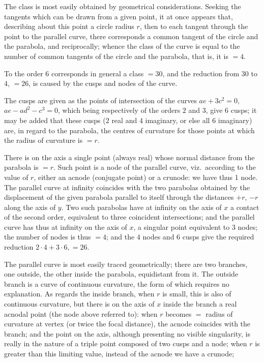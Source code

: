 \documentclass[11pt,a4paper]{article}
\theoremstyle{plain}
\theoremstyle{definition}
\begin{document}
The class is most easily obtained by geometrical considerations. Seeking the
tangents which can be drawn from a given point, it at once appears that, describing
about this point a circle radius $r$, then to each tangent through the point to the
parallel curve, there corresponds a common tangent of the circle and the parabola, and
reciprocally; whence the class of the curve is equal to the number of common tangents
of the circle and the parabola, that is, it is $= 4$.

To the order 6 corresponds in general a class $= 30$, and the reduction from
$30$ to $4$, $= 26$, is caused by the cusps and nodes of the curve.

The cusps are given as the points of intersection of the curves $ae+3c^2=0$,
$ae - ad^2 - c^3 = 0$, which being respectively of the orders $2$ and $3$, give $6$ cusps; it
may be added that these cusps ($2$ real and $4$ imaginary, or else all $6$ imaginary) are,
in regard to the parabola, the centres of curvature for those points at which the radius
of curvature is $= r$.

There is on the axis a single point (always real) whose normal distance from the
parabola is $= r$. Such point is a node of the parallel curve, viz.\ according to the
value of $r$, either an acnode (conjugate point) or a crunode: we have thus 1 node.
The parallel curve at infinity coincides with the two parabolas obtained by the displacement
of the given parabola parallel to itself through the distances $+r$, $-r$ along the axis of $y$.
Two such parabolas have at infinity on the axis of $x$ a contact of the second order,
equivalent to three coincident intersections; and the parallel curve has thus at infinity
on the axis of $x$, a singular point equivalent to $3$ nodes; the number of nodes is thus
$=4$; and the $4$ nodes and $6$ cusps give the required reduction $2\cdot4+3\cdot6,=26$.

The parallel curve is most easily traced geometrically; there are two branches, one
outside, the other inside the parabola, equidistant from it. The outside branch is a
curve of continuous curvature, the form of which requires no explanation. As regards
the inside branch, when $r$ is small, this is also of continuous curvature, but there is
on the axis of $x$ inside the branch a real acnodal point (the node above referred to):
when $r$ becomes $=$ radius of curvature at vertex (or twice the focal distance), the acnode
coincides with the branch; and the point on the axis, although presenting no visible
singularity, is really in the nature of a triple point composed of two cusps and a node;
when $r$ is greater than this limiting value, instead of the acnode we have a crunode;
\end{document}
